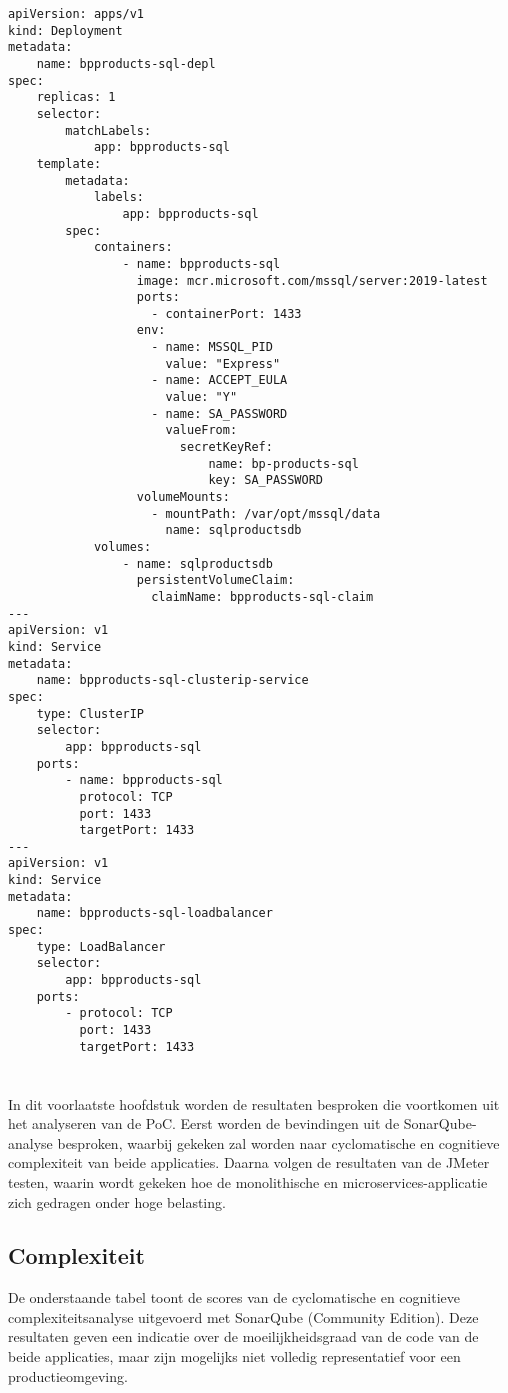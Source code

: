 \begin{lstlisting}[style=mystyleA, caption=bpproducts-sql-depl.yaml, label=lst:BPProductsSQLDepl]
apiVersion: apps/v1
kind: Deployment
metadata:
	name: bpproducts-sql-depl
spec:
	replicas: 1
	selector:
		matchLabels:
			app: bpproducts-sql
	template:
		metadata:
			labels:
				app: bpproducts-sql
		spec:
			containers:
				- name: bpproducts-sql
				  image: mcr.microsoft.com/mssql/server:2019-latest
				  ports:
					- containerPort: 1433
				  env:
					- name: MSSQL_PID
					  value: "Express"
					- name: ACCEPT_EULA
					  value: "Y"
					- name: SA_PASSWORD
					  valueFrom:
						secretKeyRef:
							name: bp-products-sql
							key: SA_PASSWORD
				  volumeMounts:
					- mountPath: /var/opt/mssql/data
					  name: sqlproductsdb
			volumes:
				- name: sqlproductsdb
				  persistentVolumeClaim:
					claimName: bpproducts-sql-claim
---
apiVersion: v1
kind: Service
metadata:
	name: bpproducts-sql-clusterip-service
spec:
	type: ClusterIP
	selector:
		app: bpproducts-sql
	ports:
		- name: bpproducts-sql
		  protocol: TCP
		  port: 1433
		  targetPort: 1433
---
apiVersion: v1
kind: Service
metadata:
	name: bpproducts-sql-loadbalancer
spec:
	type: LoadBalancer
	selector:
		app: bpproducts-sql
	ports:
		- protocol: TCP
		  port: 1433
		  targetPort: 1433
\end{lstlisting}




\chapter{}%
\label{ch:resultaten}

In dit voorlaatste hoofdstuk worden de resultaten besproken die voortkomen uit het analyseren van de PoC. Eerst worden de bevindingen uit de SonarQube-analyse besproken, waarbij gekeken zal worden naar cyclomatische en cognitieve complexiteit van beide applicaties. Daarna volgen de resultaten van de JMeter testen, waarin wordt gekeken hoe de monolithische en microservices-applicatie zich gedragen onder hoge belasting.

\section{Complexiteit}

De onderstaande tabel toont de scores van de cyclomatische en cognitieve complexiteitsanalyse uitgevoerd met SonarQube (Community Edition). Deze resultaten geven een indicatie over de moeilijkheidsgraad van de code van de beide applicaties, maar zijn mogelijks niet volledig representatief voor een productieomgeving.


